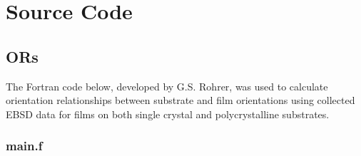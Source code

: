 
\chapter{Source Code}

\section{ORs}

The Fortran code below, developed by G.S. Rohrer, was used to calculate orientation relationships between substrate and film orientations using collected EBSD data for films on both single crystal and polycrystalline substrates.

\subsection{main.f}

    \lstset{language=Fortran,
    		stepnumber=2,
    		breaklines=true}

